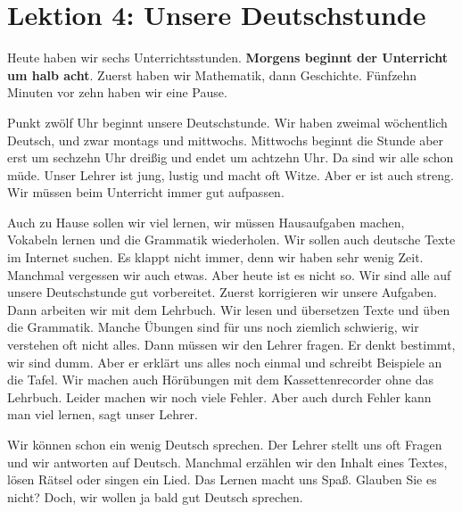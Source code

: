 \setchaptertoc
\chapter{Lektion 4: Unsere Deutschstunde}\label{NJ:chap_N1_L4}

  Heute haben wir sechs Unterrichtsstunden. \textbf{Morgens beginnt der Unterricht um halb acht}. 
  Zuerst haben wir Mathematik, dann Geschichte. Fünfzehn Minuten vor zehn haben wir eine Pause.
  
  Punkt zwölf Uhr beginnt unsere Deutschstunde. Wir haben zweimal wöchentlich Deutsch, und zwar 
  montags und mittwochs. Mittwochs beginnt die Stunde aber erst um sechzehn Uhr dreißig und endet 
  um achtzehn Uhr. Da sind wir alle schon müde. Unser Lehrer ist jung, lustig und macht oft Witze. 
  Aber er ist auch streng. Wir müssen beim Unterricht immer gut aufpassen.
  
  Auch zu Hause sollen wir viel lernen, wir müssen Hausaufgaben machen, Vokabeln lernen und die 
  Grammatik wiederholen. Wir sollen auch deutsche Texte im Internet suchen. Es klappt nicht immer, 
  denn wir haben sehr wenig Zeit. Manchmal vergessen wir auch etwas. Aber heute ist es nicht so. 
  Wir sind alle auf unsere Deutschstunde gut vorbereitet. Zuerst korrigieren wir unsere Aufgaben. 
  Dann arbeiten wir mit dem Lehrbuch. Wir lesen und übersetzen Texte und üben die Grammatik. 
  Manche Übungen sind für uns noch ziemlich schwierig, wir verstehen oft nicht alles. Dann müssen 
  wir den Lehrer fragen. Er denkt bestimmt, wir sind dumm. Aber er erklärt uns alles noch einmal 
  und schreibt Beispiele an die Tafel. Wir machen auch Hörübungen mit dem Kassettenrecorder ohne 
  das Lehrbuch. Leider machen wir noch viele Fehler. Aber auch durch Fehler kann man viel lernen, 
  sagt unser Lehrer.
  
  Wir können schon ein wenig Deutsch sprechen. Der Lehrer stellt uns oft Fragen und wir antworten 
  auf Deutsch. Manchmal erzählen wir den Inhalt eines Textes, lösen Rätsel oder singen ein Lied. 
  Das Lernen macht uns Spaß. Glauben Sie es nicht? Doch, wir wollen ja bald gut Deutsch sprechen.
  
